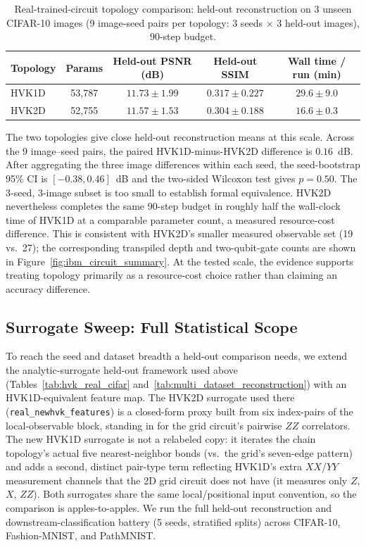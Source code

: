 \documentclass[11pt]{article}
\begin{document}
\begin{table}[H]
\centering
\caption{Real-trained-circuit topology comparison: held-out reconstruction on 3 unseen CIFAR-10 images (9 image-seed pairs per topology: 3 seeds $\times$ 3 held-out images), 90-step budget.}
\label{tab:topology_real_circuit}
\scriptsize
\begin{tabular}{lcccc}
\toprule
Topology & Params & Held-out PSNR (dB) & Held-out SSIM & Wall time / run (min) \\
\midrule
HVK1D & 53{,}787 & $11.73\pm1.99$ & $0.317\pm0.227$ & $29.6\pm9.0$ \\
HVK2D & 52{,}755 & $11.57\pm1.53$ & $0.304\pm0.188$ & $16.6\pm0.3$ \\
\bottomrule
\end{tabular}
\end{table}

The two topologies give close held-out reconstruction means at this scale. Across the 9 image--seed pairs, the paired HVK1D-minus-HVK2D difference is $0.16$~dB. After aggregating the three image differences within each seed, the seed-bootstrap 95\% CI is $[-0.38,0.46]$~dB and the two-sided Wilcoxon test gives $p=0.50$. The 3-seed, 3-image subset is too small to establish formal equivalence. HVK2D nevertheless completes the same 90-step budget in roughly half the wall-clock time of HVK1D at a comparable parameter count, a measured resource-cost difference. This is consistent with HVK2D's smaller measured observable set (19 vs.\ 27); the corresponding transpiled depth and two-qubit-gate counts are shown in Figure~\ref{fig:ibm_circuit_summary}. At the tested scale, the evidence supports treating topology primarily as a resource-cost choice rather than claiming an accuracy difference.

\subsection{Surrogate Sweep: Full Statistical Scope}
\label{sec:topology_surrogate}
To reach the seed and dataset breadth a held-out comparison needs, we extend the analytic-surrogate held-out framework used above (Tables~\ref{tab:hvk_real_cifar} and~\ref{tab:multi_dataset_reconstruction}) with an HVK1D-equivalent feature map. The HVK2D surrogate used there (\texttt{real\_newhvk\_features}) is a closed-form proxy built from six index-pairs of the local-observable block, standing in for the grid circuit's pairwise $ZZ$ correlators. The new HVK1D surrogate is not a relabeled copy: it iterates the chain topology's actual five nearest-neighbor bonds (vs.\ the grid's seven-edge pattern) and adds a second, distinct pair-type term reflecting HVK1D's extra $XX$/$YY$ measurement channels that the 2D grid circuit does not have (it measures only $Z$, $X$, $ZZ$). Both surrogates share the same local/positional input convention, so the comparison is apples-to-apples. We run the full held-out reconstruction and downstream-classification battery (5 seeds, stratified splits) across CIFAR-10, Fashion-MNIST, and PathMNIST.
\end{document}

